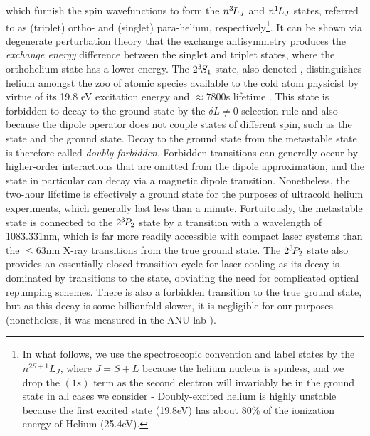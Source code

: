 	which furnish the spin wavefunctions to form the $n^{3\!} L_{J}$ and $n^{1\!} L_{J}$ states, referred to as (triplet) ortho- and (singlet) para-helium, respectively\footnote{In what follows, we use the spectroscopic convention and label states by the $n^{2S+1}L_J$, where $J=S+L$ because the helium nucleus is spinless, and we drop the $(1s)$ term as the second electron will invariably be in the ground state in all cases we consider -  Doubly-excited helium is highly unstable because the first excited state (19.8eV) has about 80\% of the ionization energy of Helium (25.4eV).}. It can be shown via degenerate perturbation theory that the exchange antisymmetry produces the \emph{exchange energy} difference between the singlet and triplet states, where the  orthohelium state has a lower energy.  The $2^{3\!}S_1$ state, also denoted \mhe, distinguishes helium amongst the zoo of atomic species available to the cold atom physicist by virtue of its 19.8 eV excitation energy and $\approx 7800$s lifetime \cite{hodgman09}.  This state is forbidden to decay to the ground state by the $\delta L\neq0$ selection rule and also because the dipole operator does not couple states of different spin, such as the \mhe state and the ground state. Decay to the ground state from the metastable state is  therefore called \emph{doubly forbidden}. Forbidden transitions can generally occur by higher-order interactions that are omitted from the dipole approximation, and the \mhe state in particular can decay via a magnetic dipole transition. Nonetheless, the two-hour lifetime is effectively a ground state for the purposes of ultracold helium experiments, which generally last less than a minute. Fortuitously, the metastable state is connected to the $2^{3\!} P_2$ state by a transition with a wavelength of 1083.331nm, which is far more readily accessible with compact laser systems than the $\leq 63$nm X-ray transitions from the true ground state. The $2^{3\!} P_2$ state also provides an essentially closed transition cycle for laser cooling as its decay is dominated by transitions to the \mhe state, obviating the need for complicated optical repumping schemes. There is also a forbidden transition to the true ground state, but as this decay is some billionfold slower, it is negligible for our purposes (nonetheless, it was measured in the ANU lab \cite{Hodgman09_23P}).

